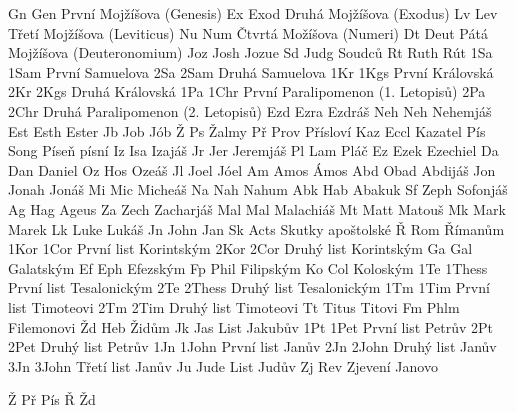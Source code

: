 \BookTitle  Gn  Gen    {První Mojžíšova (Genesis)}
\BookTitle  Ex  Exod   {Druhá Mojžíšova (Exodus)}
\BookTitle  Lv  Lev    {Třetí Mojžíšova (Leviticus)}
\BookTitle  Nu  Num    {Čtvrtá Možíšova (Numeri)}
\BookTitle  Dt  Deut   {Pátá Mojžíšova (Deuteronomium)}
\BookTitle  Joz Josh   {Jozue}
\BookTitle  Sd  Judg   {Soudců}
\BookTitle  Rt  Ruth   {Rút}
\BookTitle  1Sa 1Sam   {První Samuelova}
\BookTitle  2Sa 2Sam   {Druhá Samuelova}
\BookTitle  1Kr 1Kgs   {První Královská}
\BookTitle  2Kr 2Kgs   {Druhá Královská}
\BookTitle  1Pa 1Chr   {První Paralipomenon (1. Letopisů)}
\BookTitle  2Pa 2Chr   {Druhá Paralipomenon (2. Letopisů)}
\BookTitle  Ezd Ezra   {Ezdráš}
\BookTitle  Neh Neh    {Nehemjáš}
\BookTitle  Est Esth   {Ester}
\BookTitle  Jb  Job    {Jób}
\BookTitle  Ž   Ps     {Žalmy}
\BookTitle  Př  Prov   {Přísloví}
\BookTitle  Kaz Eccl   {Kazatel}
\BookTitle  Pís Song   {Píseň písní}
\BookTitle  Iz  Isa    {Izajáš}
\BookTitle  Jr  Jer    {Jeremjáš}
\BookTitle  Pl  Lam    {Pláč}
\BookTitle  Ez  Ezek   {Ezechiel}
\BookTitle  Da  Dan    {Daniel}
\BookTitle  Oz  Hos    {Ozeáš}
\BookTitle  Jl  Joel   {Jóel}
\BookTitle  Am  Amos   {Ámos}
\BookTitle  Abd Obad   {Abdijáš}
\BookTitle  Jon Jonah  {Jonáš}
\BookTitle  Mi  Mic    {Micheáš}
\BookTitle  Na  Nah    {Nahum}
\BookTitle  Abk Hab    {Abakuk}
\BookTitle  Sf  Zeph   {Sofonjáš}
\BookTitle  Ag  Hag    {Ageus}
\BookTitle  Za  Zech   {Zacharjáš}
\BookTitle  Mal Mal    {Malachiáš}
\BookTitle  Mt  Matt   {Matouš}
\BookTitle  Mk  Mark   {Marek}
\BookTitle  Lk  Luke   {Lukáš}
\BookTitle  Jn  John   {Jan}
\BookTitle  Sk  Acts   {Skutky apoštolské}
\BookTitle  Ř   Rom    {Římanům}
\BookTitle  1Kor 1Cor  {První list Korintským}
\BookTitle  2Kor 2Cor  {Druhý list Korintským}
\BookTitle  Ga  Gal    {Galatským}
\BookTitle  Ef  Eph    {Efezským}
\BookTitle  Fp  Phil   {Filipským}
\BookTitle  Ko Col    {Koloským}
\BookTitle  1Te 1Thess {První list Tesalonickým}
\BookTitle  2Te 2Thess {Druhý list Tesalonickým}
\BookTitle  1Tm 1Tim   {První list Timoteovi}
\BookTitle  2Tm 2Tim   {Druhý list Timoteovi}
\BookTitle  Tt  Titus  {Titovi}
\BookTitle  Fm  Phlm   {Filemonovi}
\BookTitle  Žd  Heb    {Židům}
\BookTitle  Jk  Jas    {List Jakubův}
\BookTitle  1Pt 1Pet   {První list Petrův}
\BookTitle  2Pt 2Pet   {Druhý list Petrův}
\BookTitle  1Jn 1John  {První list Janův}
\BookTitle  2Jn 2John  {Druhý list Janův}
\BookTitle  3Jn 3John  {Třetí list Janův}
\BookTitle  Ju  Jude   {List Judův}
\BookTitle  Zj  Rev    {Zjevení Janovo}     

\BookException Ž   {\def\amark{Z}}
\BookException Př  {\def\amark{Pr}}
\BookException Pís {\def\amark{Pis}}
\BookException Ř   {\def\amark{R}}
\BookException Žd  {\def\amark{Zd}}

\def\nochapbooks{Abd Fm 2Jn 3Jn Ju}
